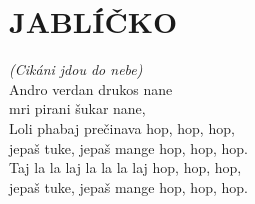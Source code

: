 \section*{\Huge JABLÍČKO}
\emph{(Cikáni jdou do nebe)}\\

Andro verdan drukos nane\\
mri pirani šukar nane,\\

Loli phabaj prečinava hop, hop, hop,\\
jepaš tuke, jepaš mange hop, hop, hop.\\

Taj la la laj la \hspace{0,8cm}la la laj hop, hop, hop,\\
jepaš tuke, jepaš mange hop, hop, hop.

\newpage
